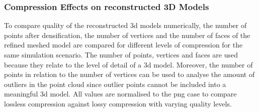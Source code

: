 \subsubsection{Compression Effects on reconstructed 3D Models}
To compare  quality of the reconstructed \gls{3d} models numerically, the number of points after densification, the number of vertices and the number of faces of the refined meshed model are compared for different levels of compression for the same simulation scenario. The number of points, vertices and faces are used because they relate to the level of detail of a \gls{3d} model. Moreover, the number of points in relation to the number of vertices can be used to analyse the amount of outliers in the point cloud since outlier points cannot be included into a meaningful \gls{3d} model. All values are normalised to the \gls{png} case to compare lossless compression against lossy compression with varying quality levels.

